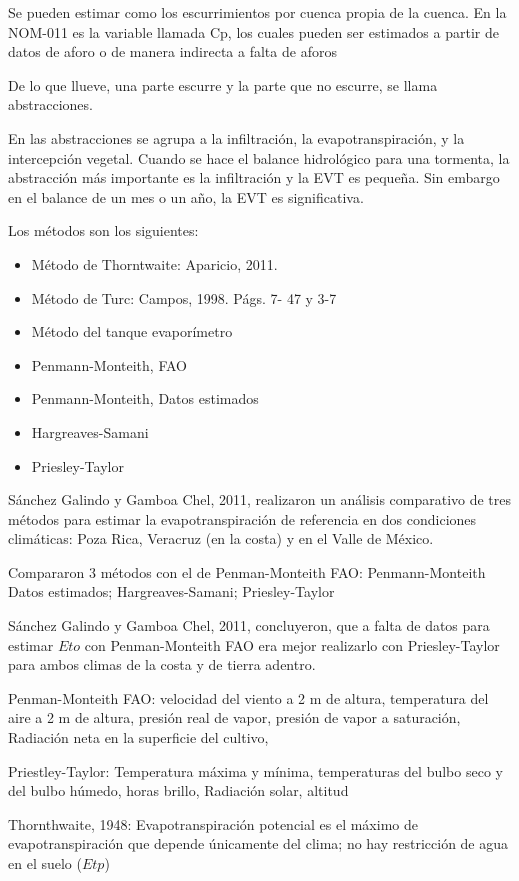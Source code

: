 Se pueden estimar como los escurrimientos por cuenca propia de la cuenca. En la NOM-011 es la variable llamada Cp, los cuales pueden ser estimados a partir de datos de aforo o de manera indirecta a falta de aforos

De lo que llueve, una parte escurre y la parte que no escurre, se llama abstracciones.

En las abstracciones se agrupa a la infiltración, la evapotranspiración, y la intercepción vegetal. Cuando se hace el balance hidrológico para una tormenta, la abstracción más importante es la infiltración y la EVT es pequeña. Sin embargo en el balance de un mes o un año, la EVT es significativa.

Los métodos son los siguientes:
\begin{itemize}
    \item Método de Thorntwaite: Aparicio, 2011.
    \item Método de Turc: Campos, 1998. Págs. 7- 47 y 3-7
    \item Método del tanque evaporímetro
    \item Penmann-Monteith, FAO
    \item Penmann-Monteith, Datos estimados
    \item Hargreaves-Samani
    \item Priesley-Taylor
\end{itemize}

Sánchez Galindo y Gamboa Chel, 2011, realizaron un análisis comparativo de tres métodos para estimar la evapotranspiración de referencia en dos condiciones climáticas: Poza Rica, Veracruz (en la costa) y en el Valle de México.

Compararon 3 métodos con el de Penman-Monteith FAO: Penmann-Monteith Datos estimados; Hargreaves-Samani; Priesley-Taylor

Sánchez Galindo y Gamboa Chel, 2011, concluyeron, que a falta de datos para estimar $Eto$ con Penman-Monteith FAO era mejor realizarlo con Priesley-Taylor para ambos climas de la costa y de tierra adentro.

Penman-Monteith FAO: velocidad del viento a 2 m de altura, temperatura del aire a 2 m de altura, presión real de vapor, presión de vapor a saturación, Radiación neta en la superficie del cultivo,

Priestley-Taylor: Temperatura máxima y mínima, temperaturas del bulbo seco y del bulbo húmedo, horas brillo, Radiación solar, altitud

Thornthwaite, 1948: Evapotranspiración potencial es el máximo de evapotranspiración que depende únicamente del clima; no hay restricción de agua en el suelo ($Etp$)

